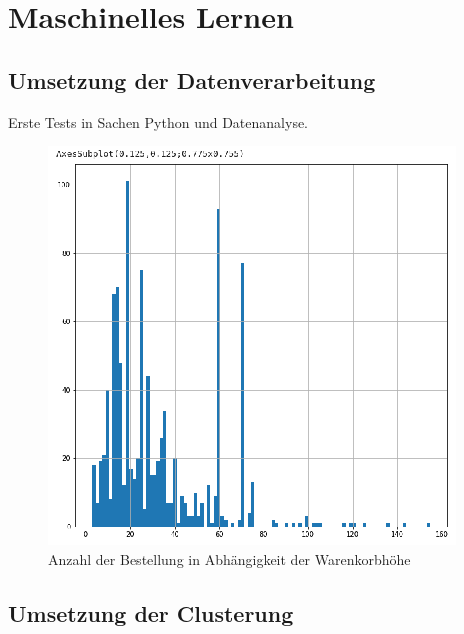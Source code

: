 \chapter{Maschinelles Lernen}
\section{Umsetzung der Datenverarbeitung}
Erste Tests in Sachen Python und Datenanalyse.

\begin{figure}[!ht]
	\centering
	\includegraphics[width=\linewidth]{images/chapter4/first_plot.eps}
	\caption{Anzahl der Bestellung in Abhängigkeit der Warenkorbhöhe}
	\label{img:plot_count_amount}
\end{figure}

\section{Umsetzung der Clusterung}
